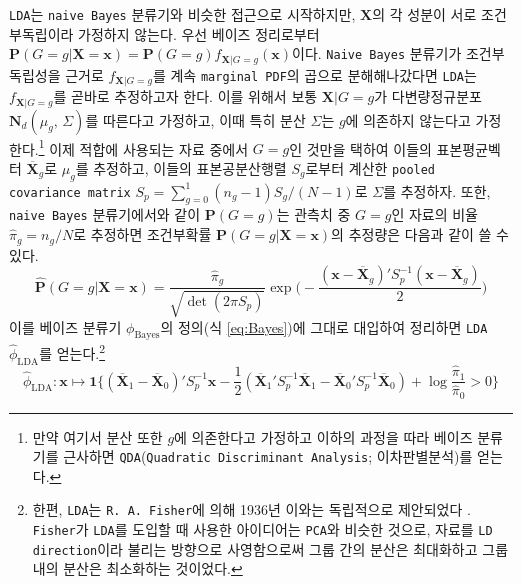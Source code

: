 \documentclass[10pt,onecolumn,twoside,a4size]{gsag3jnl}
\begin{document}
\texttt{LDA}는 \texttt{naive Bayes} 분류기와 비슷한 접근으로 시작하지만, $\mathbf{X}$의 각 성분이 서로 조건부독립이라 가정하지 않는다. 우선 베이즈 정리로부터 $\mathbf{P}(G=g\vert\mathbf{X}=\mathbf{x})=\mathbf{P}(G=g)f_{\mathbf{X}\vert G=g}(\mathbf{x})$이다. \texttt{Naive Bayes} 분류기가 조건부독립성을 근거로 $f_{\mathbf{X}\vert G=g}$를 계속 \texttt{marginal PDF}의 곱으로 분해해나갔다면 \texttt{LDA}는 $f_{\mathbf{X}\vert G=g}$를 곧바로 추정하고자 한다. 이를 위해서 보통 $\mathbf{X}\vert G=g$가 다변량정규분포 $\mathbf{N}_d(\mu_g,\,\Sigma)$를 따른다고 가정하고, 이때 특히 분산 $\Sigma$는 $g$에 의존하지 않는다고 가정한다.\footnote{만약 여기서 분산 또한 $g$에 의존한다고 가정하고 이하의 과정을 따라 베이즈 분류기를 근사하면 \texttt{QDA}(\texttt{Quadratic Discriminant Analysis}; 이차판별분석)를 얻는다.} 이제 적합에 사용되는 자료 중에서 $G=g$인 것만을 택하여 이들의 표본평균벡터 $\overline{\mathbf{X}}_g$로 $\mu_g$를 추정하고, 이들의 표본공분산행렬 $S_g$로부터 계산한 \texttt{pooled covariance matrix} $S_p=\sum_{g=0}^1(n_g-1)S_g/(N-1)$로 $\Sigma$를 추정하자. 또한, \texttt{naive Bayes} 분류기에서와 같이 $\mathbf{P}(G=g)$는 관측치 중 $G=g$인 자료의 비율 $\widehat{\pi}_g=n_g/N$로 추정하면 조건부확률 $\mathbf{P}(G=g\vert\mathbf{X}=\mathbf{x})$의 추정량은 다음과 같이 쓸 수 있다.
\begin{equation}
  \widehat{\mathbf{P}}(G=g\vert\mathbf{X}=\mathbf{x})=\frac{\widehat{\pi}_g}{\sqrt{\det(2\pi S_p)}}\exp\bigg(-\frac{(\mathbf{x}-\overline{\mathbf{X}}_g)'S_p^{-1}(\mathbf{x}-\overline{\mathbf{X}}_g)}{2}\bigg)
\end{equation}
이를 베이즈 분류기 $\phi_\mathrm{Bayes}$의 정의(식 \ref{eq:Bayes})에 그대로 대입하여 정리하면 \texttt{LDA} $\widehat{\phi}_\mathrm{LDA}$를 얻는다.\footnote{한편, \texttt{LDA}는 \texttt{R. A. Fisher}에 의해 1936년 이와는 독립적으로 제안되었다 \texttt{\citep{fisher1936use}}. \texttt{Fisher}가 \texttt{LDA}를 도입할 때 사용한 아이디어는 \texttt{PCA}와 비슷한 것으로, 자료를 \texttt{LD direction}이라 불리는 방향으로 사영함으로써 그룹 간의 분산은 최대화하고 그룹 내의 분산은 최소화하는 것이었다.}
\begin{equation}
  \widehat{\phi}_\mathrm{LDA}:\mathbf{x}\mapsto\mathbf{1}\bigg\{(\overline{\mathbf{X}}_1-\overline{\mathbf{X}}_0)'S_p^{-1}\mathbf{x}-\frac{1}{2}(\overline{\mathbf{X}}_1'S_p^{-1}\overline{\mathbf{X}}_1-\overline{\mathbf{X}}_0'S_p^{-1}\overline{\mathbf{X}}_0)+\log\frac{\widehat{\pi}_1}{\widehat{\pi}_0}>0\bigg\}
\end{equation}
\end{document}
